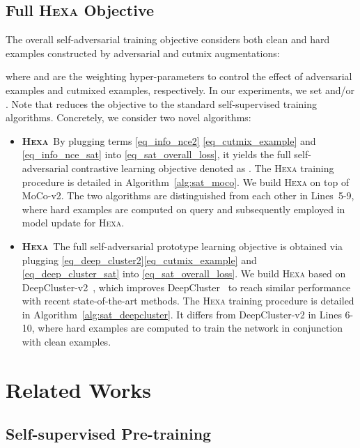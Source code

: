 \documentclass[10pt,twocolumn,letterpaper]{article}
\newcommand{\shortname}{\textsc{Hexa}}
\begin{document}
\subsection{Full \shortname{} Objective}
The overall self-adversarial training objective considers both clean and hard examples constructed by adversarial and cutmix augmentations:

where  and  are the weighting hyper-parameters to control the effect of adversarial examples and cutmixed examples, respectively. In our experiments, we set  and/or . Note that  reduces the objective to the standard self-supervised training algorithms. Concretely, we consider two novel algorithms: 

\begin{itemize}\item {\bf \shortname{}}~By plugging terms \eqref{eq_info_nce2} \eqref{eq_cutmix_example} and \eqref{eq_info_nce_sat} into \eqref{eq_sat_overall_loss}, it yields the full self-adversarial   contrastive learning objective denoted as . The \shortname{} training procedure is detailed in Algorithm~\ref{alg:sat_moco}. We build \shortname{} on top of MoCo-v2. The two algorithms are distinguished from each other in Lines~5-9, where hard examples are computed on query and subsequently employed in model update for \shortname{}.
    \vspace{-0mm}
    \item  {\bf \shortname{}}~The  full  self-adversarial prototype learning objective  is obtained via plugging \eqref{eq_deep_cluster2}\eqref{eq_cutmix_example} and \eqref{eq_deep_cluster_sat} into \eqref{eq_sat_overall_loss}.  We build \shortname{} based on DeepCluster-v2~\cite{li2020prototypical}, which improves DeepCluster~\cite{caron2018deepcluster} to reach similar performance with recent state-of-the-art methods. The \shortname{} training procedure is detailed in Algorithm~\ref{alg:sat_deepcluster}. It differs from DeepCluster-v2 in Lines 6-10, where hard examples are computed to train the network in conjunction with clean examples.
    \vspace{-0mm}
\end{itemize}
\textbf{}


\vspace{-4mm}
\section{Related Works}
\vspace{-1mm}
\subsection{Self-supervised Pre-training} 
\end{document}
